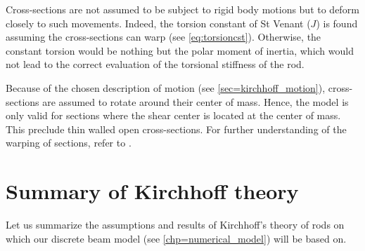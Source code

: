 Cross-sections are not assumed to be subject to rigid body motions but to deform closely to such movements. Indeed, the torsion constant of St Venant ($J$) is found assuming the cross-sections can warp (see \cref{eq:torsioncst}). Otherwise, the constant torsion would be nothing but the polar moment of inertia, which would not lead to the correct evaluation of the torsional stiffness of the rod.

Because of the chosen description of motion (see \cref{sec=kirchhoff_motion}), cross-sections are assumed to rotate around their center of mass. Hence, the model is only valid for sections where the shear center is located at the center of mass. This preclude thin walled open cross-sections. For further understanding of the warping of sections, refer to \cite{Alves2014}.


\section{Summary of Kirchhoff theory}\label{sec=ksummary}
Let us summarize the assumptions and results of Kirchhoff's theory of rods on which our discrete beam model (see \cref{chp=numerical_model}) will be based on.

